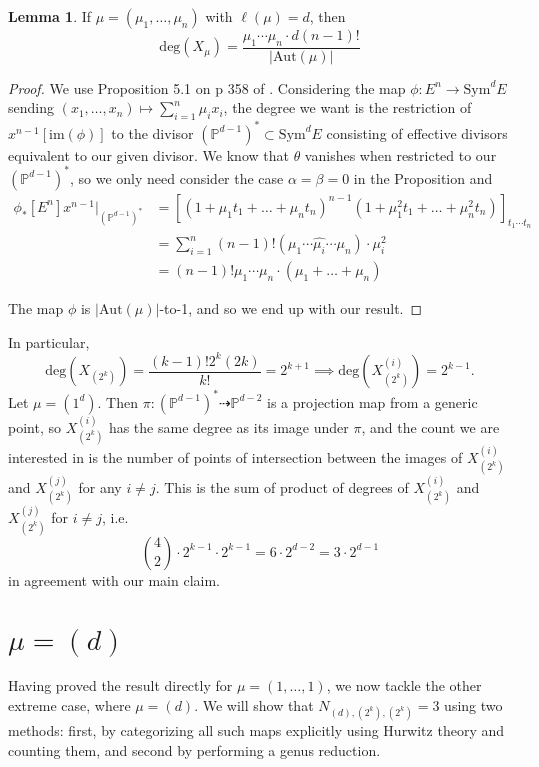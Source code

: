 \documentclass[thesis]{thesis-umich}           %
\newcommand{\Aut}{\text{Aut}}
\renewcommand{\P}{\mathbb P}
\theoremstyle{definition}
\newtheorem{lem}[thm]{Lemma}
\begin{document}
\begin{lem}
  \label{lemma:degree}
  If $\mu=(\mu_1,\dots,\mu_n)$ with $\ell(\mu)=d$, then
  \[
  \text{deg}(X_{\mu})=\frac{\mu_1\cdots\mu_n\cdot d(n-1)!}{|\text{Aut}(\mu)|}
  \]
\end{lem}

\begin{proof}
  We use Proposition 5.1 on p 358 of \cite{Harris}. Considering the map
  $\phi:E^n\to\text{Sym}^dE$ sending $(x_1,\dots,x_n)\mapsto \sum_{i=1}^n\mu_ix_i$,
  the degree we want is the restriction of $x^{n-1}[\text{im}(\phi)]$ to
  the divisor $(\P^{d-1})^*\subset\text{Sym}^dE$ consisting of effective divisors
  equivalent to our given divisor. We know that $\theta$ vanishes when
  restricted to our $(\P^{d-1})^*$, so we only need consider the case $\alpha=\beta=0$ in the Proposition and
  \begin{align*}
    \phi_*[E^n]x^{n-1}\bigg|_{(\P^{d-1})^*}&=[(1+\mu_1t_1+\dots+\mu_nt_n)^{n-1}(1+\mu_1^2t_1+\dots+\mu_n^2t_n)]_{t_1\cdots t_n}\\
    &=\sum_{i=1}^n(n-1)!(\mu_1\cdots\hat{\mu_i}\cdots \mu_n)\cdot\mu_i^2\\
    &=(n-1)!\mu_1\cdots\mu_n\cdot (\mu_1+\dots+\mu_n)
  \end{align*}

  
  The map $\phi$ is $|\Aut(\mu)|$-to-1, and so we end up with our result.
  \end{proof}
In particular,
\[
\text{deg}(X_{(2^k)})=\frac{(k-1)!2^k(2k)}{k!}=2^{k+1}\implies \text{deg}(X_{(2^k)}^{(i)})=2^{k-1}.
\]
Let $\mu=(1^{d})$. Then $\pi:(\P^{d-1})^*\dashrightarrow\P^{d-2}$ is
a projection map from a generic point, so $X_{(2^k)}^{(i)}$ has the same
degree as its image under $\pi$, and the count we are interested in is the
number of points of intersection between the images of $X_{(2^k)}^{(i)}$ and
$X_{(2^k)}^{(j)}$ for any $i\neq j$.
This is the sum of product of degrees of $X_{(2^k)}^{(i)}$ and $X_{(2^k)}^{(j)}$ for $i\neq j$, i.e.
\[
\binom 42\cdot 2^{k-1}\cdot 2^{k-1}=6\cdot 2^{d-2}=3\cdot 2^{d-1}
\]
in agreement with our main claim.


\section{$\mu=(d)$}

Having proved the result directly for $\mu=(1,\dots,1)$, we now tackle the other extreme case, where $\mu=(d)$. We will show that $N_{(d),(2^k),(2^k)}=3$
using two methods: first, by categorizing all such maps explicitly using Hurwitz theory and counting them, and second by performing a genus reduction.
\end{document}
